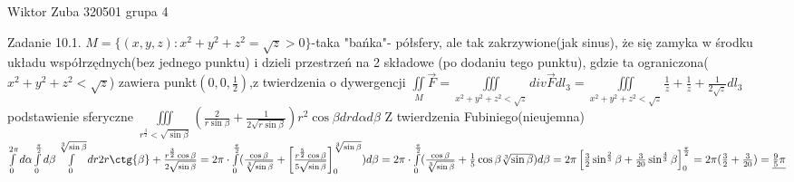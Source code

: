 \documentclass{article}
\begin{document}
Wiktor Zuba 320501 grupa 4
\newline

Zadanie 10.1.
\newline
\newline
$
M=\{(x,y,z):x^2+y^2+z^2=\sqrt{z}>0\}
$-taka "bańka"- półsfery, ale tak zakrzywione(jak sinus), że się zamyka w środku układu współrzędnych(bez jednego punktu)
i dzieli przestrzeń na 2 składowe (po dodaniu tego punktu),
gdzie ta ograniczona($x^2+y^2+z^2<\sqrt{z}$) zawiera punkt$(0,0,\frac{1}{2})$,z twierdzenia o dywergencji\newline
$
\iint\limits_{M}\overrightarrow{F}=\iiint\limits_{x^2+y^2+z^2<\sqrt{z}}div\overrightarrow{F}dl_3
=\iiint\limits_{x^2+y^2+z^2<\sqrt{z}}\frac{1}{z}+\frac{1}{z}+\frac{1}{2\sqrt{z}}dl_3
$
podstawienie sferyczne
$
\iiint\limits_{r^{\frac{3}{2}}<\sqrt{\sin{\beta}}}(\frac{2}{r\sin{\beta}}+\frac{1}{2\sqrt{r\sin{\beta}}})r^2\cos{\beta}drd\alpha d\beta
$
Z twierdzenia Fubiniego(nieujemna)
$
\int\limits_{0}^{2\pi}d\alpha\int\limits_{0}^{\frac{\pi}{2}}d\beta\int\limits_{0}^{\sqrt[3]{\sin{\beta}}}dr 2r\ctg{\beta}+\frac{r^{\frac{3}{2}}\cos{\beta}}{2\sqrt{\sin{\beta}}}=
2\pi\cdot\int\limits_{0}^{\frac{\pi}{2}}(\frac{\cos{\beta}}{\sqrt[3]{\sin{\beta}}}+\left[\frac{r^{\frac{5}{2}}\cos{\beta}}{5\sqrt{\sin{\beta}}}\right]_{0}^{\sqrt[3]{\sin{\beta}}})d\beta=\newline
2\pi\cdot\int\limits_{0}^{\frac{\pi}{2}}(\frac{\cos{\beta}}{\sqrt[3]{\sin{\beta}}}+\frac{1}{5}\cos{\beta}\sqrt[3]{\sin{\beta}})d\beta=
2\pi\left[\frac{3}{2}\sin^{\frac{2}{3}}{\beta}+\frac{3}{20}\sin^{\frac{4}{3}}{\beta}\right]_{0}^{\frac{\pi}{2}}=2\pi(\frac{3}{2}+\frac{3}{20})=\underline{\frac{9}{5}\pi}
$
\newline
\newline
\end{document}
